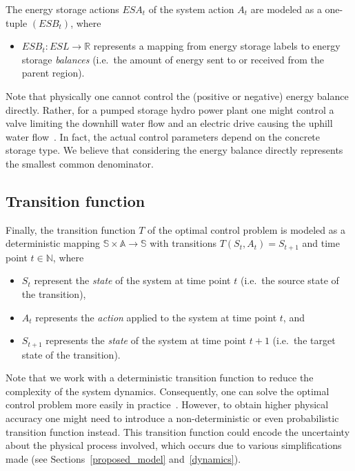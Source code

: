 The energy storage actions $ESA_t$ of the system action $A_t$ are modeled as a one-tuple $(ESB_t)$, where
\begin{itemize}
	\item $ESB_t: ESL \rightarrow \mathbb{R}$ represents a mapping from energy storage labels to energy storage \textit{balances} (i.e.\ the amount of energy sent to or received from the parent region).
\end{itemize}
Note that physically one cannot control the (positive or negative) energy balance directly. Rather, for a pumped storage hydro power plant one might control a valve limiting the downhill water flow and an electric drive causing the uphill water flow~\cite{Castronuovo2004}. In fact, the actual control parameters depend on the concrete storage type. We believe that considering the energy balance directly represents the smallest common denominator.

\subsection{Transition function}
\label{transitions}

Finally, the transition function $T$ of the optimal control problem is modeled as a deterministic mapping $\mathbb{S} \times \mathbb{A} \rightarrow \mathbb{S}$ with transitions $T(S_t, A_t) = S_{t+1}$ and time point $t \in \mathbb{N}$, where
\begin{itemize}
	\item $S_t$ represent the \textit{state} of the system at time point $t$ (i.e.\ the source state of the transition),
	\item $A_t$ represents the \textit{action} applied to the system at time point $t$, and
	\item $S_{t+1}$ represents the \textit{state} of the system at time point $t+1$ (i.e.\ the target state of the transition).
\end{itemize}
Note that we work with a deterministic transition function to reduce the complexity of the system dynamics. Consequently, one can solve the optimal control problem more easily in practice~\cite{Bertsekas1995}. However, to obtain higher physical accuracy one might need to introduce a non-deterministic or even probabilistic transition function instead. This transition function could encode the uncertainty about the physical process involved, which occurs due to various simplifications made (see Sections~\ref{proposed_model} and~\ref{dynamics}).

